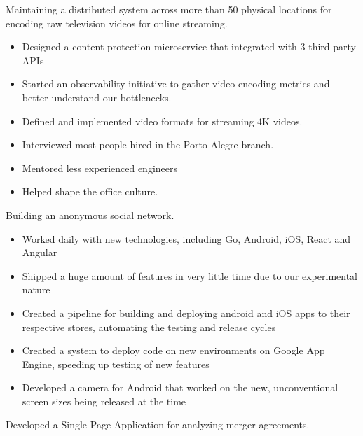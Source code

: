 \documentclass[10pt,a4paper,ragged2e,withhyper]{altacv}
\begin{document}
\begin{paracol}{2}
\divider


{\RaggedRight
Maintaining a distributed system across more than 50 physical locations for encoding raw television videos for online streaming.

\medskip

\begin{itemize}
\item Designed a content protection microservice that integrated with 3 third party APIs
\item Started an observability initiative to gather video encoding metrics and better understand our bottlenecks.
\item Defined and implemented video formats for streaming 4K videos.
\item Interviewed most people hired in the Porto Alegre branch.
\item Mentored less experienced engineers
\item Helped shape the office culture.
\end{itemize}
}

\divider


{\RaggedRight
Building an anonymous social network.

\medskip

\begin{itemize}
\item Worked daily with new technologies, including Go, Android, iOS, React and Angular
\item Shipped a huge amount of features in very little time due to our experimental nature
\item Created a pipeline for building and deploying android and iOS apps to their respective stores, automating the testing and release cycles
\item Created a system to deploy code on new environments on Google App Engine, speeding up testing of new features
\item Developed a camera for Android that worked on the new, unconventional screen sizes being released at the time
\end{itemize}
}

\divider


{\RaggedRight
Developed a Single Page Application for analyzing merger agreements.

}
\end{paracol}
\end{document}
